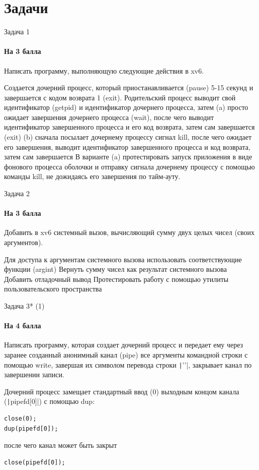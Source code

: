 \documentclass{../../slides-style}
\begin{document}
    \section{Задачи}

    \begin{frame}{Задача 1}
        \framesubtitle{На 3 балла}
        Написать программу, выполняющую следующие действия в xv6.
        \begin{outline}
            \1 Создается дочерний процесс, который приостанавливается (pause) 5-15 секунд и завершается с кодом возврата 1 (exit).
            \1 Родительский процесс выводит свой идентификатор (getpid) и идентификатор дочернего процесса, затем
                \2 (a) просто ожидает завершения дочернего процесса (wait), после чего выводит идентификатор завершенного процесса и его код возврата, затем сам завершается (exit)
                \2 (b) сначала посылает дочернему процессу сигнал kill, после чего ожидает его завершения, выводит идентификатор завершенного процесса и код возврата, затем сам завершается
            \1 В варианте (a) протестировать запуск приложения в виде фонового процесса оболочки и отправку сигнала дочернему процессу с помощью команды kill, не дожидаясь его завершения по тайм-ауту.
        \end{outline}
    \end{frame}

    \begin{frame}[fragile]{Задача 2}
        \framesubtitle{На 3 балла}
        Добавить в xv6 системный вызов, вычисляющий сумму двух целых чисел (своих аргументов). 
        \begin{outline}
            \1 Для доступа к аргументам системного вызова использовать соответствующие функции (argint)
            \1 Вернуть сумму чисел как результат системного вызова
            \1 Добавить отладочный вывод
            \1 Протестировать работу с помощью утилиты пользовательского пространства
        \end{outline}
    \end{frame}

    \begin{frame}[fragile]{Задача 3* (1)}
        \framesubtitle{На 4 балла}
        Написать программу, которая создает дочерний процесс и передает ему через заранее созданный анонимный канал (pipe) все аргументы командной строки с помощью write, завершая их символом перевода строки \texttt|'\n'|, закрывает канал по завершении записи. 
        
        Дочерний процесс замещает стандартный ввод (0) выходным концом канала (\texttt|pipefd[0]|) с помощью dup:

        \begin{verbatim}
close(0);
dup(pipefd[0]);
        \end{verbatim}

        после чего канал может быть закрыт
        
        \begin{verbatim}
close(pipefd[0]);
        \end{verbatim}
    \end{frame}
\end{document}
